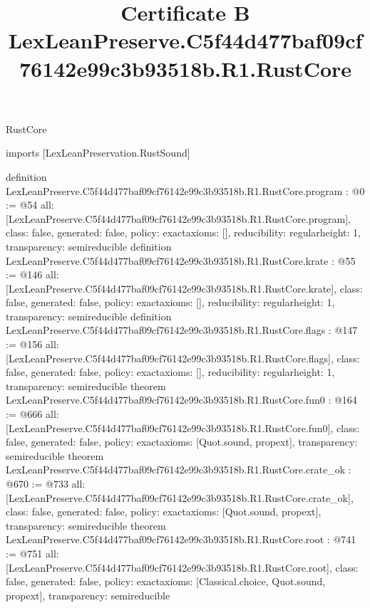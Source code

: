 \begin{lexlean}{RustCore}
\title{Certificate B LexLeanPreserve.C5f44d477baf09cf76142e99c3b93518b.R1.RustCore}
\begin{coremodule}
imports [LexLeanPreservation.RustSound]

definition LexLeanPreserve.C5f44d477baf09cf76142e99c3b93518b.R1.RustCore.program : @0 := @54 {
  all: [LexLeanPreserve.C5f44d477baf09cf76142e99c3b93518b.R1.RustCore.program],
  class: false,
  generated: false,
  policy: exact{axioms: []},
  reducibility: regular{height: 1},
  transparency: semireducible
}
definition LexLeanPreserve.C5f44d477baf09cf76142e99c3b93518b.R1.RustCore.krate : @55 := @146 {
  all: [LexLeanPreserve.C5f44d477baf09cf76142e99c3b93518b.R1.RustCore.krate],
  class: false,
  generated: false,
  policy: exact{axioms: []},
  reducibility: regular{height: 1},
  transparency: semireducible
}
definition LexLeanPreserve.C5f44d477baf09cf76142e99c3b93518b.R1.RustCore.flags : @147 := @156 {
  all: [LexLeanPreserve.C5f44d477baf09cf76142e99c3b93518b.R1.RustCore.flags],
  class: false,
  generated: false,
  policy: exact{axioms: []},
  reducibility: regular{height: 1},
  transparency: semireducible
}
theorem LexLeanPreserve.C5f44d477baf09cf76142e99c3b93518b.R1.RustCore.fun0 : @164 := @666 {
  all: [LexLeanPreserve.C5f44d477baf09cf76142e99c3b93518b.R1.RustCore.fun0],
  class: false,
  generated: false,
  policy: exact{axioms: [Quot.sound, propext]},
  transparency: semireducible
}
theorem LexLeanPreserve.C5f44d477baf09cf76142e99c3b93518b.R1.RustCore.crate_ok : @670 := @733 {
  all: [LexLeanPreserve.C5f44d477baf09cf76142e99c3b93518b.R1.RustCore.crate_ok],
  class: false,
  generated: false,
  policy: exact{axioms: [Quot.sound, propext]},
  transparency: semireducible
}
theorem LexLeanPreserve.C5f44d477baf09cf76142e99c3b93518b.R1.RustCore.root : @741 := @751 {
  all: [LexLeanPreserve.C5f44d477baf09cf76142e99c3b93518b.R1.RustCore.root],
  class: false,
  generated: false,
  policy: exact{axioms: [Classical.choice, Quot.sound, propext]},
  transparency: semireducible
}


\end{coremodule}
\end{lexlean}
